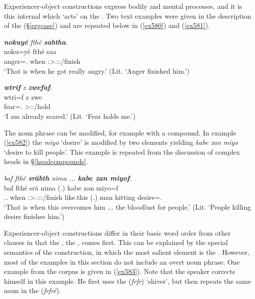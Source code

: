 Experiencer-object constructions express bodily and mental processes, and it is this internal  which `acts' on the . Two text examples were given in the description of the   (\S{}\ref{ergcase}) and are repeated below in (\ref{ex580}) and (\ref{ex581}).

\begin{exe}
	\ex \emph{\textbf{nokuyé} fthé \textbf{sabtha}.}\\
	\gll noku=yé fthé saa\\
	anger=\Erg.\Nsg{} when \Stsg:\Sbj>\Tsg.\Masc:\Pst:\Pfv/finish\\
	\trans `That is when he got really angry.' (Lit. `Anger finished him.')\\
	\label{ex580}
\end{exe}

\begin{exe}
	\ex \emph{\textbf{wtrif} z \textbf{zwefaf}.}\\
	\gll wtri=f z zwe\\
	fear=\Erg.\Sg{} \Iam{} \Stsg>\Fsg:\Rpst:\Pfv/hold\\
	\trans `I am already scared.' (Lit. `Fear holds me.')
	\label{ex581}
\end{exe}

The  noun phrase can be modified, for example with a  compound. In example (\ref{ex582}) the  \emph{miyo} `desire' is modified by two elements yielding \emph{kabe zan miyo} `desire to kill people'. This example is repeated from the discussion of complex heads in \S{}\ref{headcompounds}.

\begin{exe}
	\ex \emph{baf fthé \textbf{sräbth} nima ... \textbf{kabe zan miyof}.}\\
	\gll baf fthé srä nima (.) kabe zan miyo=f\\
	\Recog.\Erg.\Sg{} when \Stsg:\Sbj>\Tsg.\Masc:\Obj:\Irr:\Pfv/finish like.this (.) man hitting desire=\Erg.\Sg\\
	\trans `That is when this overcomes him ... the bloodlust for people.' (Lit. `People killing desire finishes him.')
	\label{ex582}
\end{exe}

Experiencer-object constructions differ in their basic word order from other clauses in that the , the , comes first. This can be explained by the special semantics of the  construction, in which the most salient element is the . However, most of the examples in this section do not include an overt noun phrase. One example from the corpus is given in (\ref{ex583}). Note that the speaker corrects himself in this example. He first uses the  (\emph{frfr}) `shiver', but then repeats the same noun in the  (\emph{frfré}).

